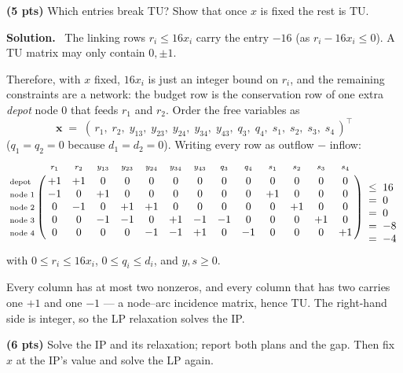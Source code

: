 \documentclass[10pt]{article}
\newenvironment{solution}
  {\par\smallskip\begingroup\color{solink}\textbf{Solution.}\ }
  {\endgroup\par}
\begin{document}
\begin{parts}
\item \textbf{(5 pts)} Which entries break TU? Show that once $x$ is fixed the rest is TU.

\begin{solution}
The linking rows $r_i \le 16 x_i$ carry the entry $-16$ (as $r_i - 16x_i \le 0$). A TU
matrix may only contain $0, \pm 1$.

Therefore, with $x$ fixed, $16 x_i$ is just an integer bound on $r_i$, and the remaining
constraints are a network: the budget row is the conservation row of one extra \emph{depot}
node $0$ that feeds $r_1$ and $r_2$. Order the free variables as
\[
  \mathbf{x} \;=\; (\,r_1,\; r_2,\; y_{13},\; y_{23},\; y_{24},\; y_{34},\; y_{43},\;
                     q_3,\; q_4,\; s_1,\; s_2,\; s_3,\; s_4\,)^{\top}
\]
($q_1 = q_2 = 0$ because $d_1 = d_2 = 0$). Writing every row as outflow $-$ inflow:
\[
\bordermatrix{%
  & \scriptstyle r_1 & \scriptstyle r_2 & \scriptstyle y_{13}
  & \scriptstyle y_{23} & \scriptstyle y_{24} & \scriptstyle y_{34} & \scriptstyle y_{43}
  & \scriptstyle q_3 & \scriptstyle q_4 & \scriptstyle s_1 & \scriptstyle s_2
  & \scriptstyle s_3 & \scriptstyle s_4 \cr
 \scriptstyle \text{depot} & +1 & +1 &  0 &  0 &  0 &  0 &  0 &  0 &  0 &  0 &  0 &  0 &  0 \cr
 \scriptstyle \text{node }1 & -1 &  0 & +1 &  0 &  0 &  0 &  0 &  0 &  0 & +1 &  0 &  0 &  0 \cr
 \scriptstyle \text{node }2 &  0 & -1 &  0 & +1 & +1 &  0 &  0 &  0 &  0 &  0 & +1 &  0 &  0 \cr
 \scriptstyle \text{node }3 &  0 &  0 & -1 & -1 &  0 & +1 & -1 & -1 &  0 &  0 &  0 & +1 &  0 \cr
 \scriptstyle \text{node }4 &  0 &  0 &  0 &  0 & -1 & -1 & +1 &  0 & -1 &  0 &  0 &  0 & +1 \cr}
\begin{array}{l}
 \phantom{\le\;0} \\
 \le\;16 \\ =\;0 \\ =\;0 \\ =\;-8 \\ =\;-4
\end{array}
\]
with $0 \le r_i \le 16 x_i$, $0 \le q_i \le d_i$, and $y, s \ge 0$.

Every column has at most two nonzeros, and every column that has two carries one $+1$ and
one $-1$ --- a node--arc incidence matrix, hence TU. The right-hand side is integer, so the
LP relaxation solves the IP.
\end{solution}

\item \textbf{(6 pts)} Solve the IP and its relaxation; report both plans and the gap. Then
  fix $x$ at the IP's value and solve the LP again.


\end{parts}
\end{document}
